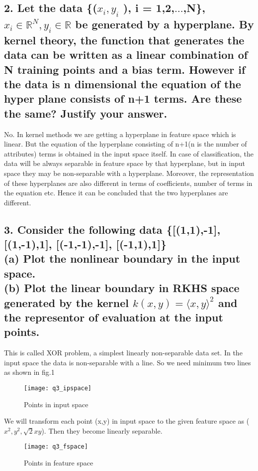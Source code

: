 \documentclass{article}
\begin{document}
\subsection{\textbf{2. Let the data \{($x_i , y_i$ ), i = 1,2,$\ldots$,N\}, $x_i \in \mathbb{R}^N, y_i \in \mathbb{R}$ be generated by a hyperplane. By kernel theory, the function that generates the data can be written as a linear combination of N training points and a bias term. However if the data is n dimensional the equation of the hyper plane consists of n+1 terms. Are these the same? Justify your answer.}}

No. In kernel methods we are getting a hyperplane in feature space which is linear. But the equation of the hyperplane consisting of n+1(n is the number of attributes) terms is obtained in the input space itself. In case of classification, the data will be always separable in feature space by that hyperplane, but in input space they may be non-separable with a hyperplane. Moreover, the representation of these hyperplanes are also different in terms of coefficients, number of terms in the equation etc. Hence it can be concluded that the two hyperplanes are different.

\subsection{\textbf{3. Consider the following data \{[(1,1),-1], [(1,-1),1], [(-1,-1),-1], [(-1,1),1]\} \\ (a) Plot the nonlinear boundary in the input space.\\ (b) Plot the linear boundary in RKHS space generated by the kernel $k(x,y)=\langle x, y\rangle^2$ and the representor of evaluation at the input points.}}

This is called XOR problem, a simplest linearly non-separable data set. In the input space the data is non-separable with a line. So we need minimum two lines as shown in fig.1 
\begin{figure}[H]
  \centering
  \texttt{[image: q3\_ipspace]}
  \caption{Points in input space}
\end{figure}
We will transform each point (x,y) in input space to the given feature space as ($x^2,y^2,\sqrt{2}xy$). Then they become linearly separable.
\begin{figure}[H]
  \centering
  \texttt{[image: q3\_fspace]}
  \caption{Points in feature space}
\end{figure}
\end{document}
